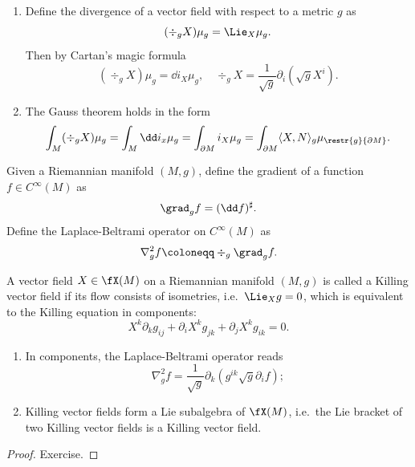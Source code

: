 \begin{cor}
    \begin{enumerate}
        \item Define the divergence of a vector field with respect to a metric $g$ as 
        \[(\div_g X)\mu_g=\Lie_X \mu_g.\]
        Then by Cartan's magic formula
        \[(\div_g X)\mu_g=\dd i_X \mu_g,\quad \div_g X=\frac{1}{\sqrt g}\partial_i(\sqrt g X^i).\label{divergence in components}\]
        \item The Gauss theorem holds in the form 
        \[\int_M (\div_g X)\mu_g=\int_M \dd i_x \mu_g=\int_{\partial M}i_X \mu_g=\int_{\partial M}\langle X,N\rangle_g \mu_{\restr{g}{\partial M}}.\]
    \end{enumerate}
\end{cor}

\begin{defn}
    Given a Riemannian manifold $(M,g)$, define the gradient  of a function $f\in C^\infty(M)$ as 
    \[\grad_g f=(\dd f)^\sharp.\]
    Define the Laplace-Beltrami operator  on $C^\infty(M)$ as
    \[\nabla^2_g f \coloneqq \div_g \grad_g f.\]
\end{defn}
\begin{defn}
    A vector field $X\in\fX(M)$ on a Riemannian manifold $(M,g)$ is called a Killing vector field if its flow consists of isometries, i.e.\ $\Lie_X g=0$, which is equivalent to the Killing equation in components:
    \[X^k\partial_k g_{ij}+\partial_i X^k g_{jk}+\partial_j X^k g_{ik}=0.\]
\end{defn}

\begin{cor}
    \begin{enumerate}
        \item In components, the Laplace-Beltrami operator reads 
        \[\nabla^2_g f=\frac{1}{\sqrt g}\partial_k (g^{ik}\sqrt g \partial_i f);\label{laplacian in components}\]
        \item Killing vector fields form a Lie subalgebra of $\fX(M)$, i.e.\ the Lie bracket of two Killing vector fields is a Killing vector field.
    \end{enumerate}
\end{cor}
\begin{proof}
    Exercise.
\end{proof}

